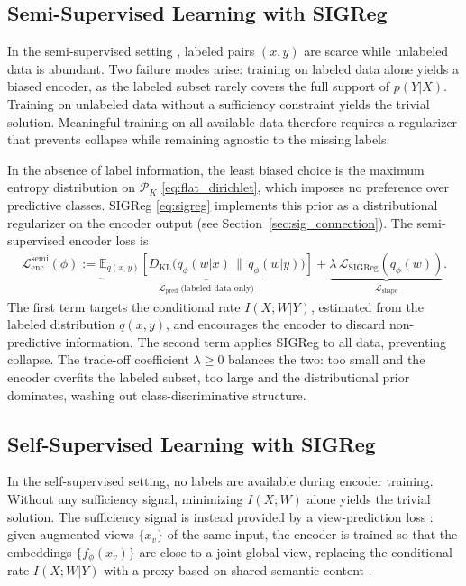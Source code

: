 \documentclass[11pt]{article}
\begin{document}
\subsection{Semi-Supervised Learning with SIGReg}
\label{sec:semi_supervised}

In the semi-supervised setting \cite{grandvalet2004semi,kingma2014semi},
labeled pairs $(x,y)$ are scarce while unlabeled data is abundant.
Two failure modes arise: training on labeled data alone yields a biased
encoder, as the labeled subset rarely covers the full support of $p(Y|X)$.
Training on unlabeled data without a sufficiency constraint yields the
trivial solution.
Meaningful training on all available data therefore requires a
regularizer that prevents collapse while remaining agnostic to the
missing labels.

In the absence of label information, the least biased choice is the
maximum entropy distribution on $\mathcal{P}_K$ \eqref{eq:flat_dirichlet},
which imposes no preference over predictive classes.
SIGReg \eqref{eq:sigreg} implements this prior as a distributional
regularizer on the encoder output (see Section~\ref{sec:sig_connection}).
The semi-supervised encoder loss is
\begin{align}
    \mathcal{L}_{\mathrm{enc}}^{\mathrm{semi}}(\phi) :=
    \underbrace{\mathbb{E}_{q(x,y)}\left[D_{\mathrm{KL}}
    \bigl(q_\phi(w|x)\,\|\,q_\phi(w|y)\bigr)\right]}_{\mathcal{L}_{\mathrm{pred}}\;\text{(labeled data only)}}
    + \underbrace{\lambda\,\mathcal{L}_{\mathrm{SIGReg}}(q_\phi(w))}_{\mathcal{L}_{\mathrm{shape}}}.
    \label{eq:semi_loss}
\end{align}
The first term targets the conditional rate $I(X;W|Y)$, estimated from
the labeled distribution $q(x,y)$, and encourages the encoder to discard non-predictive
information.
The second term applies SIGReg to all data, preventing collapse.
The trade-off coefficient $\lambda\geq 0$ balances the two:
too small and the encoder overfits the labeled subset,
too large and the distributional prior dominates,
washing out class-discriminative structure.

\subsection{Self-Supervised Learning with SIGReg}
\label{sec:self_supervised}

In the self-supervised setting, no labels are available
during encoder training.
Without any sufficiency signal, minimizing $I(X;W)$ alone yields the
trivial solution.
The sufficiency signal is instead provided by a view-prediction loss \cite{blum1998combining,chen2020simple}:
given augmented views $\{x_v\}$ of the same input, the encoder
is trained so that the embeddings $\{f_\phi(x_v)\}$ are close to
a joint global view, replacing the conditional rate $I(X;W|Y)$ with a proxy
based on shared semantic content \cite{balestriero2025lejepa}.
\end{document}
